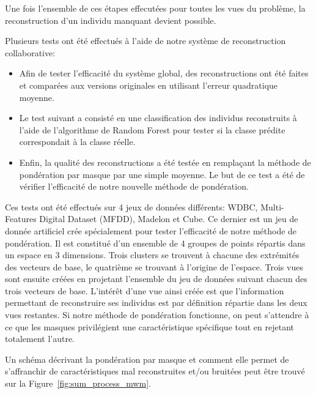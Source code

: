 \documentclass[a4paper]{article}
\begin{document}
    Une fois l'ensemble de ces étapes effecutées pour toutes les vues du problème, la reconstruction d'un individu manquant devient possible.

    Plusieurs tests ont été effectués à l'aide de notre système de reconstruction collaborative:
    \begin{itemize}
        \item Afin de tester l'efficacité du système global, des reconstructions ont été faites et comparées aux versions originales en utilisant l'erreur quadratique moyenne.
        \item Le test suivant a consisté en une classification des individus reconstruits à l'aide de l'algorithme de Random Forest pour tester si la classe prédite correspondait à la classe réelle.
        \item Enfin, la qualité des reconstructions a été testée en remplaçant la méthode de pondération par masque par une simple moyenne. Le but de ce test a été de vérifier l'efficacité de notre nouvelle méthode de pondération.
    \end{itemize}

    Ces tests ont été effectués sur 4 jeux de données différents: WDBC, Multi-Features Digital Dataset (MFDD), Madelon et Cube. Ce dernier est un jeu de donnée artificiel crée spécialement pour tester l'efficacité de notre méthode de pondération. Il est constitué d'un ensemble de 4 groupes de points répartis dans un espace en 3 dimensions. Trois clusters se trouvent à chacune des extrémités des vecteurs de base, le quatrième se trouvant à l'origine de l'espace. Trois vues sont ensuite créées en projetant l'ensemble du jeu de données suivant chacun des trois vecteurs de base. L'intérêt d'une vue ainsi créée est que l'information permettant de reconstruire ses individus est par définition répartie dans les deux vues restantes. Si notre méthode de pondération fonctionne, on peut s'attendre à ce que les masques privilégient une caractéristique spécifique tout en rejetant totalement l'autre.
    
    Un schéma décrivant la pondération par masque et comment elle permet de s'affranchir de caractéristiques mal reconstruites et/ou bruitées peut être trouvé sur la Figure~\ref{fig:sum_process_mwm}.
\end{document}
